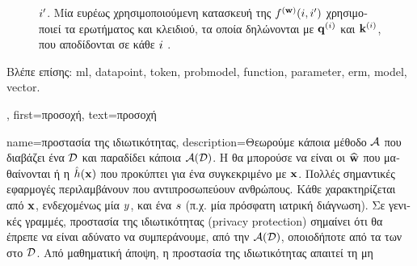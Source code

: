 {{\begin{figure}[H]
{{			 $i'$. 
			\foreignlanguage{greek}{Μία ευρέως χρησιμοποιούμενη κατασκευή της $f^{({\bf w})}(i,i')$ 
			χρησιμοποιεί τα}  \foreignlanguage{greek}{ερωτήματος και κλειδιού, τα οποία δηλώνονται 
			με ${\bf q}^{(i)}$ και ${\bf k}^{(i)}$, που αποδίδονται σε κάθε}  $i$ 
			\cite{vaswani2017attention}. \label{fig_attention_dict}} }
		\end{figure}
		\foreignlanguage{greek}{Βλέπε επίσης:} \gls{ml}, \gls{datapoint}, \gls{token}, \gls{probmodel}, \gls{function}, \gls{parameter}, \gls{erm}, 
		\gls{model}, \gls{vector}.},
	first={\foreignlanguage{greek}{προσοχή}},
	text={\foreignlanguage{greek}{προσοχή}}
}

{name={\foreignlanguage{greek}{προστασία της ιδιωτικότητας}},
	description={\foreignlanguage{greek}{Θεωρούμε κάποια μέθοδο}  
		$\mathcal{A}$ \foreignlanguage{greek}{που διαβάζει ένα}  $\mathcal{D}$ \foreignlanguage{greek}{και παραδίδει κάποια} 
		 $\mathcal{A}(\mathcal{D})$. \foreignlanguage{greek}{Η}  \foreignlanguage{greek}{θα μπορούσε να είναι οι} 
		 $\widehat{{\bf w}}$ \foreignlanguage{greek}{που μαθαί\-νονται ή η}  
		$\hat{h}({\bf x})$ \foreignlanguage{greek}{που προκύπτει για ένα συγκεκριμένο}  
		\foreignlanguage{greek}{με}  ${\bf x}$. \foreignlanguage{greek}{Πολλές σημαντικές εφαρμογές}  
		\foreignlanguage{greek}{περιλαμβάνουν}  \foreignlanguage{greek}{που αντιπροσωπεύουν ανθρώπους. Κάθε} 
		 \foreignlanguage{greek}{χαρακτηρίζεται από}  ${\bf x}$, 
		\foreignlanguage{greek}{ενδεχομένως μία}  $y$, \foreignlanguage{greek}{και ένα}  
		$s$ \foreignlanguage{greek}{(π.χ. μία πρόσφατη ιατρική διάγνωση). Σε γενικές γραμμές, προστασία της ιδιωτικότητας} (privacy protection) 
		\foreignlanguage{greek}{σημαίνει ότι θα έπρεπε να είναι αδύνατο να συμπεράνουμε, από την}  $\mathcal{A}(\mathcal{D})$, 
		\foreignlanguage{greek}{οποιοδήποτε από τα}  \foreignlanguage{greek}{των}  
		\foreignlanguage{greek}{στο} $\mathcal{D}$. \foreignlanguage{greek}{Από μαθηματική άποψη, η προστασία της ιδιωτικότητας απαιτεί τη μη 
}}}
